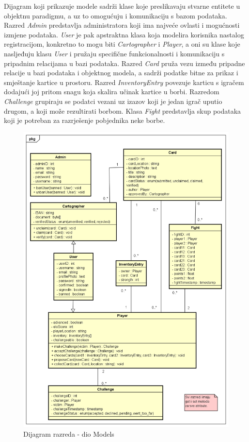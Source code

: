     		Dijagram koji prikazuje modele sadrži klase koje preslikavaju stvarne entitete u objektnu paradigmu, a uz to omogućuju i komunikaciju s bazom podataka. Razred \textit{Admin} predstavlja administratora koji ima najveće ovlasti i mogućnosti izmjene podataka. \textit{User} je pak apstraktna klasa koja modelira korisnika nastalog registracijom, konkretno to mogu biti \textit{Cartographer} i \textit{Player}, a oni su klase koje nasljeđuju klasu \textit{User} i pružaju specifične funkcionalnosti i komunikaciju s pripadnim relacijama u bazi podataka. Razred \textit{Card} pruža vezu između pripadne relacije u bazi podataka i objektnog modela, a sadrži podatke bitne za prikaz i smještanje kartice u prostoru. Razred \textit{InventoryEntry} povezuje karticu s igračem dodajući joj pritom snagu koja skalira učinak kartice u borbi. Razredom \textit{Challenge} grupiraju se podatci vezani uz izazov koji je jedan igrač uputio drugom, a koji može rezultirati borbom. Klasa \textit{Fight} predstavlja skup podataka koji je potreban za razrješenje pobjednika neke borbe.
			
			\begin{figure}[H]
        			\includegraphics[width=\textwidth]{slike/ClassDiagrams/Models.png}
        			\centering
        			\caption{Dijagram razreda - dio Models}
        			\label{fig:classDiagramModels}
        		\end{figure}
        		
